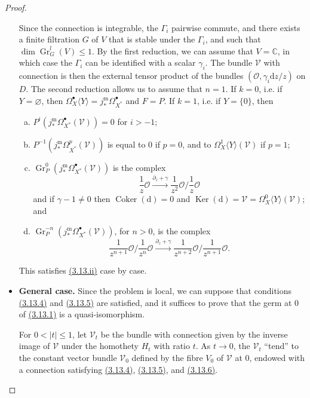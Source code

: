 \documentclass{report}
\renewcommand{\cal}[1]{{\mathcal{#1}}}
\newcommand{\CC}{\mathbb{C}}
\newcommand{\dd}{\mathrm{d}}
\renewcommand{\leq}{\leqslant}
\DeclareMathOperator{\Ker}{Ker}
\DeclareMathOperator{\Coker}{Coker}
\DeclareMathOperator{\Gr}{Gr}
\newcommand{\oldpage}[1]{\marginpar{\footnotesize$\Big\vert$ \textit{p.~#1}}}
\begin{document}
\begin{proof}
\begin{itemize}
      Since the connection is integrable, the $\Gamma_i$ pairwise commute, and there exists a finite filtration $G$ of $V$ that is stable under the $\Gamma_i$, and such that $\dim\Gr_G^l(V)\leq1$.
      By the first reduction, we can assume that $V=\CC$, in which case the $\Gamma_i$ can be identified with a scalar $\gamma_i$.
      The bundle $\cal{V}$ with connection is then the external tensor product of the bundles $(\cal{O},\gamma_i\dd z/z)$ on $D$.
      The second reduction allows us to assume that $n=1$.
      If $k=0$, i.e. if $Y=\varnothing$, then $\Omega_X^\bullet\langle Y\rangle=j_*^\mathrm{m}\Omega_{X^*}^\bullet$ and $F=P$.
      If $k=1$, i.e. if $Y=\{0\}$, then
      \begin{enumerate}[a)]
        \item $P^i(j_*^\mathrm{m}\Omega_{X^*}^\bullet(\cal{V}))=0$ for $i>-1$;
\oldpage{83}
        \item $P^{-1}(j_*^\mathrm{m}\Omega_{X^*}^p(\cal{V}))$ is equal to $0$ if $p=0$, and to $\Omega_X^1\langle Y\rangle(\cal{V})$ if $p=1$;
        \item $\Gr_P^0(j_*^\mathrm{m}\Omega_{X^*}^\bullet(\cal{V}))$ is the complex
          \[
            \frac{1}{z}\cal{O}
            \xrightarrow{\partial_z+\gamma} \frac{1}{z^2}\cal{O}\bigg/\frac{1}{z}\cal{O}
          \]
          and if $\gamma-1\neq0$ then $\Coker(\dd)=0$ and $\Ker(\dd)=\cal{V}=\Omega_X^0\langle Y\rangle(\cal{V})$; and
        \item $\Gr_P^{-n}(j_*^\mathrm{m}\Omega_{X^*}^\bullet(\cal{V}))$, for $n>0$, is the complex
          \[
            \frac{1}{z^{n+1}}\cal{O}\bigg/\frac{1}{z^{n}}\cal{O}
            \xrightarrow{\partial_z+\gamma} \frac{1}{z^{n+2}}\cal{O}\bigg/\frac{1}{z^{n+1}}\cal{O}.
          \]
      \end{enumerate}
      This satisfies \hyperref[II.3.13]{(3.13.ii)} case by case.
    \item[] \textbf{General case.}
      Since the problem is local, we can suppose that conditions \hyperref[II.3.13.4]{(3.13.4)} and \hyperref[II.3.13.5]{(3.13.5)} are satisfied, and it suffices to prove that the germ at $0$ of \hyperref[II.3.13.1]{(3.13.1)} is a quasi-isomorphism.

      For $0<|t|\leq1$, let $\cal{V}_t$ be the bundle with connection given by the inverse image of $\cal{V}$ under the homothety $H_t$ with ratio $t$.
      As $t\to0$, the $\cal{V}_t$ ``tend'' to the constant vector bundle $\cal{V}_0$ defined by the fibre $V_0$ of $\cal{V}$ at $0$, endowed with a connection satisfying \hyperref[II.3.13.4]{(3.13.4)}, \hyperref[II.3.13.5]{(3.13.5)}, and \hyperref[II.3.13.6]{(3.13.6)}.


\end{itemize}
\end{proof}
\end{document}
